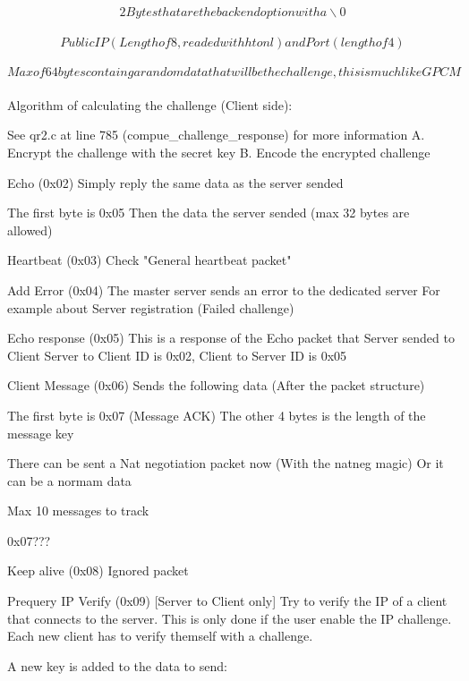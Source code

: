 \documentclass[oneside,titlepage,a4paper]{Definition/retrospy} %
\begin{document}
\[2 Bytes that are the backend option with a \backslash 0\] \\
\[Public IP (Length of 8, readed with htonl) and Port (length of 4)\]\\
\[ Max of 64 bytes containg a random data that will be the challenge, this is much like GPCM \]\\

Algorithm of calculating the challenge (Client side):

See qr2.c at line 785 (compue\_challenge\_response) for more information
A. Encrypt the challenge with the secret key
B. Encode the encrypted challenge

Echo (0x02)
Simply reply the same data as the server sended

The first byte is 0x05
Then the data the server sended (max 32 bytes are allowed)

Heartbeat (0x03)
Check "General heartbeat packet"

Add Error (0x04)
The master server sends an error to the dedicated server
For example about Server registration (Failed challenge)

Echo response (0x05)
This is a response of the Echo packet that Server sended to Client
Server to Client ID is 0x02, Client to Server ID is 0x05

Client Message (0x06)
Sends the following data (After the packet structure)

The first byte is 0x07 (Message ACK)
The other 4 bytes is the length of the message key

There can be sent a Nat negotiation packet now (With the natneg magic)
Or it can be a normam data

Max 10 messages to track

0x07???

Keep alive (0x08)
Ignored packet

Prequery IP Verify (0x09) [Server to Client only]
Try to verify the IP of a client that connects to the server.
This is only done if the user enable the IP challenge.
Each new client has to verify themself with a challenge.

A new key is added to the data to send:



\end{document}
